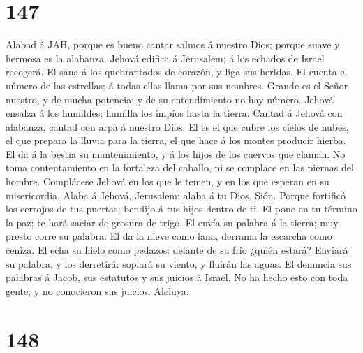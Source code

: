 \hypertarget{section-146}{%
\section{147}\label{section-146}}

 Alabad á JAH, porque es bueno cantar salmos á nuestro
Dios; porque suave y hermosa es la alabanza.  Jehová
edifica á Jerusalem; á los echados de Israel recogerá.  El
sana á los quebrantados de corazón, y liga sus heridas. 
El cuenta el número de las estrellas; á todas ellas llama por sus
nombres.  Grande es el Señor nuestro, y de mucha potencia;
y de su entendimiento no hay número.  Jehová ensalza á los
humildes; humilla los impíos hasta la tierra.  Cantad á
Jehová con alabanza, cantad con arpa á nuestro Dios.  El
es el que cubre los cielos de nubes, el que prepara la lluvia para la
tierra, el que hace á los montes producir hierba.  El da á
la bestia su mantenimiento, y á los hijos de los cuervos que claman.
 No toma contentamiento en la fortaleza del caballo, ni
se complace en las piernas del hombre.  Complácese Jehová
en los que le temen, y en los que esperan en su misericordia.
 Alaba á Jehová, Jerusalem; alaba á tu Dios, Sión.
 Porque fortificó los cerrojos de tus puertas; bendijo á
tus hijos dentro de ti.  El pone en tu término la paz; te
hará saciar de grosura de trigo.  El envía su palabra á
la tierra; muy presto corre su palabra.  El da la nieve
como lana, derrama la escarcha como ceniza.  El echa su
hielo como pedazos: delante de su frío ¿quién estará? 
Enviará su palabra, y los derretirá: soplará su viento, y fluirán las
aguas.  El denuncia sus palabras á Jacob, sus estatutos y
sus juicios á Israel.  No ha hecho esto con toda gente; y
no conocieron sus juicios. Aleluya.

\hypertarget{section-147}{%
\section{148}\label{section-147}}

